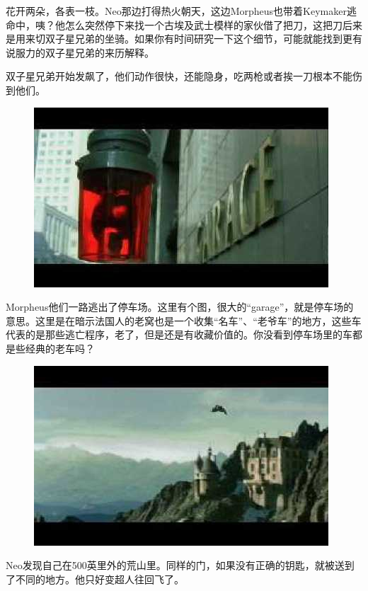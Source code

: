 \documentclass{ctexart}
\begin{document}
花开两朵，各表一枝。Neo那边打得热火朝天，这边Morpheus也带着Keymaker逃命中，咦？他怎么突然停下来找一个古埃及武士模样的家伙借了把刀，这把刀后来是用来切双子星兄弟的坐骑。如果你有时间研究一下这个细节，可能就能找到更有说服力的双子星兄弟的来历解释。

双子星兄弟开始发飙了，他们动作很快，还能隐身，吃两枪或者挨一刀根本不能伤到他们。

\begin{figure}[htb]
\centering
\includegraphics[width=0.5\linewidth]{fig/read_reloaded-128}
\end{figure}

Morpheus他们一路逃出了停车场。这里有个图，很大的“garage”，就是停车场的意思。这里是在暗示法国人的老窝也是一个收集“名车”、“老爷车”的地方，这些车代表的是那些逃亡程序，老了，但是还是有收藏价值的。你没看到停车场里的车都是些经典的老车吗？

\begin{figure}[htb]
\centering
\includegraphics[width=0.5\linewidth]{fig/read_reloaded-129}
\end{figure}

Neo发现自己在500英里外的荒山里。同样的门，如果没有正确的钥匙，就被送到了不同的地方。他只好变超人往回飞了。
\end{document}
